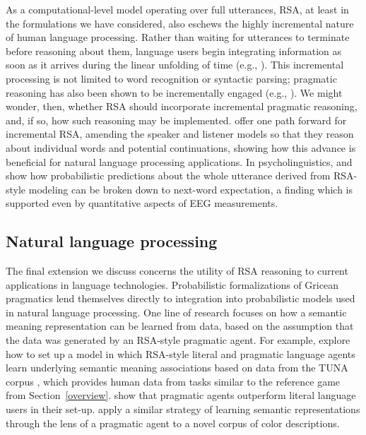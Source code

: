 \documentclass{sp}
\begin{document}
As a computational-level model operating over full utterances, RSA, at least in the formulations we have considered, also eschews the highly incremental nature of human language processing. Rather than waiting for utterances to terminate before reasoning about them, language users begin integrating information as soon as it arrives during the linear unfolding of time (e.g., \citealp{tanenhausetal1995}). This incremental processing is not limited to word recognition or syntactic parsing; pragmatic reasoning has also been shown to be incrementally engaged (e.g., \citealp{sedivyetal1999,sedivy2007}). We might wonder, then, whether RSA should incorporate incremental pragmatic reasoning, and, if so, how such reasoning may be implemented. \cite{cohngordgonetal2019} offer one path forward for incremental RSA, amending the speaker and listener models so that they reason about individual words and potential continuations, showing how this advance is beneficial for natural language processing applications.
In psycholinguistics, \cite{WerningCosentino2017:The-interaction} and \cite{AugurzkyFranke2019:Gricean-expecta} show how probabilistic predictions about the whole utterance derived from RSA-style modeling can be broken down to next-word expectation, a finding which is supported even by quantitative aspects of EEG measurements.

\subsection{Natural language processing}

The final extension we discuss concerns the utility of RSA reasoning to current applications in language technologies. 
Probabilistic formalizations of Gricean pragmatics lend themselves directly to integration into probabilistic models used in natural language processing.
One line of research focuses on how a semantic meaning representation can be learned from data, based on the assumption that the data was generated by an RSA-style pragmatic agent.
For example, \citet{Monroe:Potts:2015} explore how to set up a model in which RSA-style literal and pragmatic language agents learn underlying semantic meaning associations based on data from the TUNA corpus \citep{DeemterSluis2006:Building-a-Sema}, which provides human data from tasks similar to the reference game from Section~\ref{overview}.
\citeauthor{Monroe:Potts:2015} show that pragmatic agents outperform literal language users in their set-up.
\citet{Monroe:Hawkins:Goodman:Potts:2017} apply a similar strategy of learning semantic representations through the lens of a pragmatic agent to a novel corpus of color descriptions.
\end{document}
